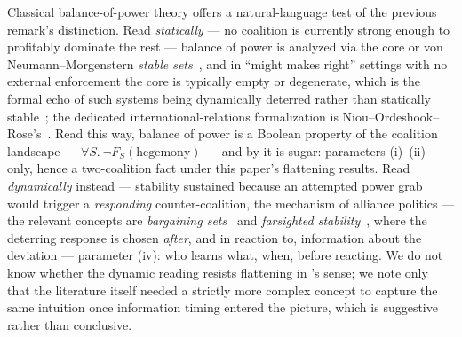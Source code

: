 \begin{remark}
\label{rem:balance-of-power}
Classical balance-of-power theory offers a natural-language test of the
previous remark's distinction. Read \emph{statically} --- no coalition is
currently strong enough to profitably dominate the rest --- balance of power
is analyzed via the core or von Neumann--Morgenstern \emph{stable
sets}~\cite{VonNeumannMorgenstern1944}, and in ``might makes right'' settings
with no external enforcement the core is typically empty or degenerate,
which is the formal echo of such systems being dynamically deterred rather
than statically stable~\cite{Jordan2006PillageAndProperty}; the dedicated
international-relations formalization is
Niou--Ordeshook--Rose's~\cite{NiouOrdeshookRose1989BalanceOfPower}. Read this
way, balance of power is a Boolean property of the coalition landscape ---
$\forall S.\ \neg F_S(\text{hegemony})$ --- and by
 it is sugar: parameters (i)--(ii)
only, hence a two-coalition fact under this paper's flattening results. Read
\emph{dynamically} instead --- stability sustained because an attempted
power grab would trigger a \emph{responding} counter-coalition, the
mechanism of alliance politics --- the relevant concepts are \emph{bargaining
sets}~\cite{AumannMaschler1964BargainingSet} and \emph{farsighted
stability}~\cite{Chwe1994FarsightedCoalitionalStability,RayVohra2015FarsightedStableSet},
where the deterring response is chosen \emph{after}, and in reaction to,
information about the deviation --- parameter (iv): who learns what, when,
before reacting. We do not know whether the dynamic reading resists
flattening in \KFOL's sense; we note only that the literature itself needed
a strictly more complex concept to capture the same intuition once
information timing entered the picture, which is suggestive rather than
conclusive.
\end{remark}

